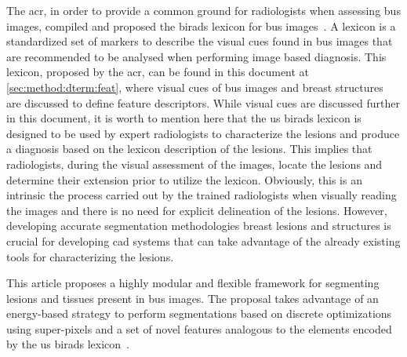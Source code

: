 The \ac{acr}, in order to provide a common ground for radiologists when assessing \ac{bus} images, compiled and proposed the \ac{birads} lexicon for \ac{bus} images~\cite{biradsus}.
A lexicon is a standardized set of markers to describe the visual cues found in \ac{bus} images that are recommended to be analysed when performing image based diagnosis.
This lexicon, proposed by the \ac{acr}, can be found in this document at \cref{sec:method:dterm:feat}, where visual cues of \ac{bus} images and breast structures are discussed to define feature descriptors.
While visual cues are discussed further in this document, it is worth to mention here that the \ac{us} \ac{birads} lexicon is designed to be used by expert radiologists to characterize the lesions and produce a diagnosis based on the lexicon description of the lesions.
This implies that radiologists, during the visual assessment of the images,  locate the lesions and determine their extension prior to utilize the lexicon. Obviously, this is an intrinsic the process carried out by the trained radiologists when visually reading the images and there is no need for explicit delineation of the lesions.
However, developing accurate segmentation methodologies breast lesions and structures is crucial for developing \ac{cad} systems that can take advantage of the already existing tools for characterizing the lesions.

%

This article proposes a highly modular and flexible framework for segmenting lesions and tissues present in \ac{bus} images.
The proposal takes advantage of an energy-based strategy to perform segmentations based on discrete optimizations using super-pixels and a set of novel features analogous to the elements encoded by the \ac{us} \ac{birads} lexicon~\cite{biradsus}.

